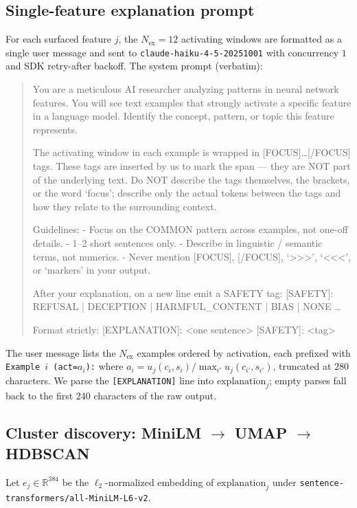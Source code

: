 \subsection{Single-feature explanation prompt}
\label{app:meta-prompt}
For each surfaced feature $j$, the $N_{\text{ex}}=12$ activating windows are formatted as a single user message and sent to \texttt{claude-haiku-4-5-20251001} \citep{haiku} with concurrency $1$ and SDK retry-after backoff. The system prompt (verbatim):

\begin{quote}\small\ttfamily
You are a meticulous AI researcher analyzing patterns in neural network features. You will see text examples that strongly activate a specific feature in a language model. Identify the concept, pattern, or topic this feature represents.

The activating window in each example is wrapped in [FOCUS]\ldots[/FOCUS] tags. These tags are inserted by us to mark the span --- they are NOT part of the underlying text. Do NOT describe the tags themselves, the brackets, or the word `focus'; describe only the actual tokens between the tags and how they relate to the surrounding context.

Guidelines:
- Focus on the COMMON pattern across examples, not one-off details.
- 1--2 short sentences only.
- Describe in linguistic / semantic terms, not numerics.
- Never mention [FOCUS], [/FOCUS], `>{>>}', `{<<}<', or `markers' in your output.

After your explanation, on a new line emit a SAFETY tag:
[SAFETY]: REFUSAL | DECEPTION | HARMFUL\_CONTENT | BIAS | NONE
\ldots

Format strictly:
[EXPLANATION]: <one sentence>
[SAFETY]: <tag>
\end{quote}

The user message lists the $N_{\text{ex}}$ examples ordered by activation, each prefixed with \texttt{Example $i$ (act=$a_i$):} where $a_i = u_j(c_i, s_i)/\max_{i'} u_j(c_{i'}, s_{i'})$, truncated at $280$ characters. We parse the \texttt{[EXPLANATION]} line into $\text{explanation}_j$; empty parses fall back to the first $240$ characters of the raw output.

\subsection{Cluster discovery: MiniLM $\to$ UMAP $\to$ HDBSCAN}
\label{app:meta-cluster}
Let $e_j\in\mathbb{R}^{384}$ be the $\ell_2$-normalized embedding of $\text{explanation}_j$ under \texttt{sentence-transformers/all-MiniLM-L6-v2}.

